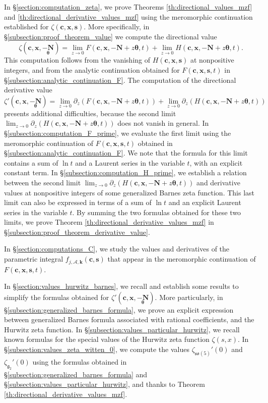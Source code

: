 \documentclass[a4paper]{amsart}
\theoremstyle{remark}
\theoremstyle{definition}
\begin{document}
In §\ref{section:computation_zeta}, we prove Theorems \ref{th:directional_values_mzf} and \ref{th:directional_derivative_values_mzf} using the meromorphic continuation established for $\zeta(\mathbf{c},\mathbf{x},\mathbf{s})$. More specifically, in §\ref{subsection:proof_theorem_value} we compute the directional value 
$$ \zeta(\mathbf{c},\mathbf{x},\underset{\bm{\theta}}{-\mathbf{N}})=\lim_{z \to 0} F(\mathbf{c},\mathbf{x},-\mathbf{N}+z\bm{\theta},t)+\lim_{z \to 0} H(\mathbf{c},\mathbf{x},-\mathbf{N}+z\bm{\theta},t). $$
This computation follows from the vanishing of $H(\mathbf{c},\mathbf{x},\mathbf{s})$ at nonpositive integers, and from the analytic continuation obtained for $F(\mathbf{c},\mathbf{x},\mathbf{s},t)$ in §\ref{subsection:analytic_continuation_F}. The computation of the directional derivative value 
$$ \zeta'(\mathbf{c},\mathbf{x},\underset{\bm{\theta}}{-\mathbf{N}})=\lim_{z \to 0} \partial_z \left(F(\mathbf{c},\mathbf{x},-\mathbf{N}+z\bm{\theta},t)\right)+\lim_{z \to 0} \partial_z \left(H(\mathbf{c},\mathbf{x},-\mathbf{N}+z\bm{\theta},t)\right) $$
presents additional difficulties, because the second limit $\lim_{z \to 0} \partial_z \left(H(\mathbf{c},\mathbf{x},-\mathbf{N}+z\bm{\theta},t)\right)$ does not vanish in general. In §\ref{subsection:computation_F_prime}, we evaluate the first limit using the meromorphic continuation of $F(\mathbf{c},\mathbf{x},\mathbf{s},t)$ obtained in §\ref{subsection:analytic_continuation_F}. We note that the formula for this limit contains a sum of $\ln t$ and a Laurent series in the variable $t$, with an explicit constant term. In §\ref{subsection:computation_H_prime}, we establish a relation between the second limit $\lim_{z \to 0} \partial_z \left(H(\mathbf{c},\mathbf{x},-\mathbf{N}+z\bm{\theta},t)\right)$ and derivative values at nonpositive integers of some generalized Barnes zeta function. This last limit can also be expressed in terms of a sum of $\ln t$ and an explicit Laurent series in the variable $t$. By summing the two formulas obtained for these two limits, we prove Theorem \ref{th:directional_derivative_values_mzf} in §\ref{subsection:proof_theorem_derivative_value}.

In §\ref{section:computations_C}, we study the values and derivatives of the parametric integral $f_{j,\mathcal{A},\mathbf{k}}(\mathbf{c},\mathbf{s})$ that appear in the meromorphic continuation of $F(\mathbf{c},\mathbf{x},\mathbf{s},t)$.

In §\ref{section:values_hurwitz_barnes}, we recall and establish some results to simplify the formulas obtained for $\zeta'(\mathbf{c},\mathbf{x},\underset{\bm{\theta}}{-\mathbf{N}})$. More particularly, in §\ref{subsection:generalized_barnes_formula}, we prove an explicit expression between generalized Barnes formula associated with rational coefficients, and the Hurwitz zeta function. In §\ref{subsection:values_particular_hurwitz}, we recall known formulas for the special values of the Hurwitz zeta function $\zeta(s,x)$. In §\ref{subsection:values_zeta_witten_0}, we compute the values $\zeta_{\mathfrak{so}(5)}'(0)$ and $\zeta_{\mathfrak{g}_2}'(0)$ using the formulas obtained in §\ref{subsection:generalized_barnes_formula} and §\ref{subsection:values_particular_hurwitz}, and thanks to Theorem \ref{th:directional_derivative_values_mzf}.
\end{document}

